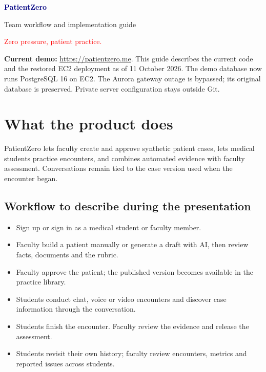 \documentclass[10pt,letterpaper]{article}
\newcommand{\callout}[1]{\par\vspace{5pt}\noindent\colorbox{pale}{\parbox{\dimexpr\linewidth-2\fboxsep\relax}{\small #1}}\par\vspace{5pt}}
\begin{document}
{\Huge\bfseries\textcolor{navy}{PatientZero}}\par
{\Large Team workflow and implementation guide}\par
\textcolor{red}{Zero pressure, patient practice.}

\callout{\textbf{Current demo:} \url{https://patientzero.me}. This guide describes the current code and the restored EC2 deployment as of 11 October 2026. The demo database now runs PostgreSQL 16 on EC2. The Aurora gateway outage is bypassed; its original database is preserved. Private server configuration stays outside Git.}

\section{What the product does}
PatientZero lets faculty create and approve synthetic patient cases, lets medical students practice encounters, and combines automated evidence with faculty assessment. Conversations remain tied to the case version used when the encounter began.

\subsection*{Workflow to describe during the presentation}
\begin{itemize}
\item Sign up or sign in as a medical student or faculty member.
\item Faculty build a patient manually or generate a draft with AI, then review facts, documents and the rubric.
\item Faculty approve the patient; the published version becomes available in the practice library.
\item Students conduct chat, voice or video encounters and discover case information through the conversation.
\item Students finish the encounter. Faculty review the evidence and release the assessment.
\item Students revisit their own history; faculty review encounters, metrics and reported issues across students.
\end{itemize}
\end{document}
